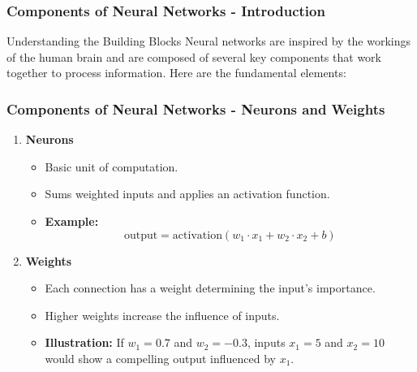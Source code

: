 \documentclass[aspectratio=169]{beamer}
\begin{document}
\begin{frame}[fragile]
    \frametitle{Components of Neural Networks - Introduction}
    
    \begin{block}{Understanding the Building Blocks}
        Neural networks are inspired by the workings of the human brain and are composed of several key components that work together to process information. Here are the fundamental elements:
    \end{block}
\end{frame}

\begin{frame}[fragile]
    \frametitle{Components of Neural Networks - Neurons and Weights}
    
    \begin{enumerate}
        \item \textbf{Neurons}
        \begin{itemize}
            \item Basic unit of computation.
            \item Sums weighted inputs and applies an activation function.
            \item \textbf{Example:} 
            \[
            \text{output} = \text{activation}(w_1 \cdot x_1 + w_2 \cdot x_2 + b)
            \]
        \end{itemize}

        \item \textbf{Weights}
        \begin{itemize}
            \item Each connection has a weight determining the input's importance.
            \item Higher weights increase the influence of inputs.
            \item \textbf{Illustration:} If $w_1 = 0.7$ and $w_2 = -0.3$, inputs $x_1 = 5$ and $x_2 = 10$ would show a compelling output influenced by $x_1$.
        \end{itemize}
    \end{enumerate}
\end{frame}
\end{document}
